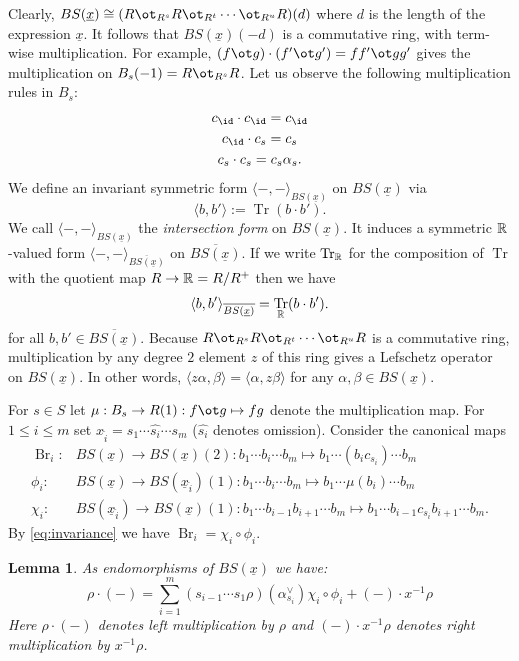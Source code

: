 \documentclass[11pt]{amsart}
\numberwithin{equation}{section}
\def\a{\alpha}
\def\b{\beta}
\DeclareMathOperator{\Tr}{Tr}
\def\ov{\overline}
\def\un{\underline}
\def\to{\rightarrow}
\DeclareMathOperator{\Br}{Br}
\newtheorem{lem}[thm]{Lemma}
\theoremstyle{definition}
\theoremstyle{remark}
\begin{document}
Clearly, $BS(\un{x}) \cong (R \ot_{R^s} R \ot_{R^t} \cdots
\ot_{R^u} R) (d)$ where $d$ is the length of the expression $\un{x}$. It
follows that 
$BS(\un{x})(-d)$ is a commutative ring, with term-wise multiplication. For example, $(f \ot g) \cdot (f' \ot g') = ff' \ot gg'$ gives the multiplication on $B_s(-1) = R \ot_{R^s} R$. Let
us observe the following multiplication rules in $B_s$: \begin{gather} c_{\id} \cdot c_{\id} = c_{\id} \\ c_{\id} \cdot c_s = c_s \\ c_s \cdot c_s = c_s \a_s. \end{gather} We
define an invariant symmetric form $\langle -, - \rangle_{BS(\un{x})}$ on $BS(\un{x})$ via \[ \langle b, b' \rangle := \Tr(b \cdot b'). \] We call $\langle -, -
\rangle_{BS(\un{x})}$ the \emph{intersection form} on
$BS(\un{x})$. It induces a symmetric ${\mathbb{R}}$-valued form $\langle -, -
\rangle_{\overline{BS(\un{x})}}$ on $\ov{BS(\un{x})}$. If we write
$\Tr_\RM$ for the composition of $\Tr$ with the quotient map $R \to
\RM = R/R^+$ then we have
\[
\langle b, b' \rangle_{\ov{BS(\un{x})}} = \Tr_\RM(b \cdot b').
\]
for all $b, b' \in \ov{BS(\un{x})}$. Because $R \ot_{R^s} R \ot_{R^t}
\cdots \ot_{R^u} R$ is a commutative 
ring, multiplication by any degree $2$ element $z$ of this ring 
gives a Lefschetz operator on $BS(\un{x})$. In other words, $\langle
z\alpha,\beta \rangle = \langle \a,z\b \rangle$ for any $\a, \b \in BS(\un{x})$.

For $s \in S$ let $\mu : B_s \to R(1) : f\ot g \mapsto fg$ denote
the multiplication map. For $1 \le i \le m$ set $x_{\widehat{i}} = s_1 \cdots \widehat{s_i}
\cdots s_m$ ($\widehat{s_i}$ denotes omission). Consider the canonical maps 
\begin{align*}
\Br_i : & BS(\un{x}) \to BS(\un{x})(2) : b_1 \cdots b_i \cdots b_m
\mapsto b_1 \cdots (b_ic_{s_i}) \cdots b_m \\
\phi_i : & BS(\un{x}) \to BS(\un{x}_{\widehat{i}})(1) : b_1 \cdots b_i \cdots
b_m \mapsto b_1 \cdots \mu(b_i) \cdots b_m \\
\chi_i : & BS(\un{x}_{\widehat{i}}) \to BS(\un{x})(1) : b_1 \cdots
b_{i-1}b_{i+1} \cdots b_m \mapsto b_1 \cdots b_{i-1}c_{s_i}b_{i+1} \cdots b_m.
\end{align*}
By \eqref{eq:invariance} we have $\Br_i = \chi_i \circ \phi_i$.

\begin{lem} \label{lem: breaking lefschetz}
As endomorphisms of $BS(\un{x})$ we have:
\[
\rho \cdot (-) = \sum_{i = 1}^m (s_{i-1} \cdots s_1 \rho
)(\a_{s_i}^\vee)  \chi_i \circ \phi_i + (-) \cdot x^{-1}\rho
\]
Here $\rho \cdot (-)$ denotes left multiplication by $\rho$ and $(-) \cdot x^{-1}\rho$ denotes right
multiplication by $x^{-1}\rho$.
\end{lem}
\end{document}
